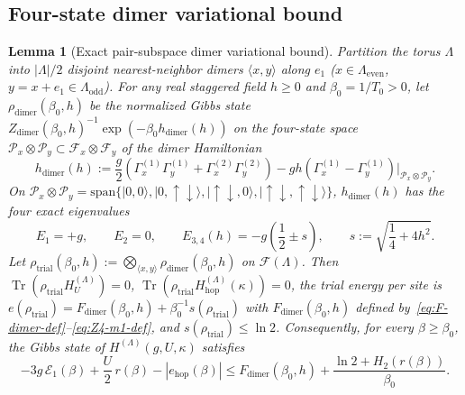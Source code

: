 \documentclass[11pt]{article}
\newtheorem{lemma}[theorem]{Lemma}
\theoremstyle{definition}
\theoremstyle{remark}
\DeclareMathOperator{\Tr}{Tr}
\newcommand{\calF}{\mathcal{F}}
\newcommand{\calP}{\mathcal{P}}
\newcommand{\calE}{\mathcal{E}}
\begin{document}
\subsection{Four-state dimer variational bound}\label{subsec:dimer}

\begin{lemma}[Exact pair-subspace dimer variational bound]\label{lem:dimer}
Partition the torus $\Lambda$ into $|\Lambda|/2$ disjoint nearest-neighbor dimers $\langle x, y\rangle$ along $e_1$ ($x \in \Lambda_{\mathrm{even}}$, $y = x + e_1 \in \Lambda_{\mathrm{odd}}$). For any real staggered field $h \ge 0$ and $\beta_0 = 1/T_0 > 0$, let $\rho_{\mathrm{dimer}}(\beta_0, h)$ be the normalized Gibbs state $Z_{\mathrm{dimer}}(\beta_0, h)^{-1}\exp(-\beta_0 h_{\mathrm{dimer}}(h))$ on the four-state space $\calP_x \otimes \calP_y \subset \calF_x \otimes \calF_y$ of the dimer Hamiltonian
\begin{equation}\label{eq:h-dimer}
h_{\mathrm{dimer}}(h) := \frac{g}{2}\left(\Gamma_x^{(1)}\Gamma_y^{(1)} + \Gamma_x^{(2)}\Gamma_y^{(2)}\right) - g h\left(\Gamma_x^{(1)} - \Gamma_y^{(1)}\right)\Big|_{\calP_x \otimes \calP_y}.
\end{equation}
On $\calP_x \otimes \calP_y = \mathrm{span}\{|0,0\rangle, |0,\uparrow\downarrow\rangle, |\uparrow\downarrow,0\rangle, |\uparrow\downarrow,\uparrow\downarrow\rangle\}$, $h_{\mathrm{dimer}}(h)$ has the four exact eigenvalues
\begin{equation}\label{eq:dimer-evals}
E_1 = +g, \qquad E_2 = 0, \qquad E_{3,4}(h) = -g\left(\frac{1}{2} \pm s\right), \qquad s := \sqrt{\frac{1}{4} + 4h^2}.
\end{equation}
Let $\rho_{\mathrm{trial}}(\beta_0, h) := \bigotimes_{\langle x, y\rangle} \rho_{\mathrm{dimer}}(\beta_0, h)$ on $\calF(\Lambda)$. Then $\Tr(\rho_{\mathrm{trial}} H_U^{(\Lambda)}) = 0$, $\Tr(\rho_{\mathrm{trial}} H_{\mathrm{hop}}^{(\Lambda)}(\kappa)) = 0$, the trial energy per site is $e(\rho_{\mathrm{trial}}) = F_{\mathrm{dimer}}(\beta_0, h) + \beta_0^{-1}s(\rho_{\mathrm{trial}})$ with $F_{\mathrm{dimer}}(\beta_0, h)$ defined by~\eqref{eq:F-dimer-def}--\eqref{eq:Z4-m1-def}, and $s(\rho_{\mathrm{trial}}) \le \ln 2$. Consequently, for \emph{every} $\beta \ge \beta_0$, the Gibbs state of $H^{(\Lambda)}(g, U, \kappa)$ satisfies
\begin{equation}\label{eq:dimer-ineq}
-3 g\,\calE_1(\beta) + \frac{U}{2}\,r(\beta) - |e_{\mathrm{hop}}(\beta)| \le F_{\mathrm{dimer}}(\beta_0, h) + \frac{\ln 2 + H_2(r(\beta))}{\beta_0}.
\end{equation}
\end{lemma}
\end{document}

